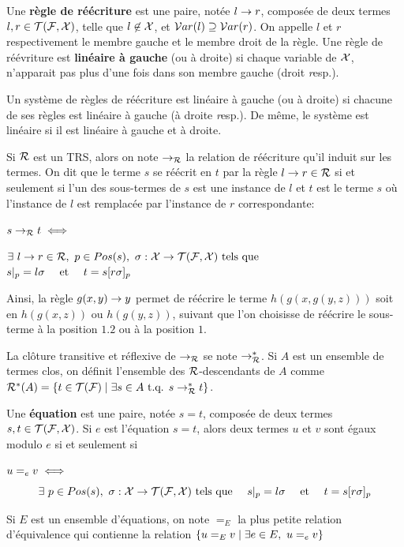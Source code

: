 \begin{definition}
  Une \textbf{règle de réécriture} est une paire, notée $l \rightarrow r$, composée de deux termes $l, r \in \mathcal{T(F, X)}$,
  telle que $l \not \in \mathcal X$, et $\mathcal{ V}ar(l) \supseteq \mathcal{ V}ar(r)$. 
  On appelle $l$ et $r$ respectivement le membre gauche et le membre droit de la règle.
  Une règle de réévriture est \textbf{linéaire à gauche} (ou à droite) si chaque variable de $\mathcal X$, 
  n'apparait pas plus d'une fois dans son membre gauche (droit {\textit resp.}).
\end{definition}

Un système de règles de réécriture est linéaire à gauche (ou à droite) si chacune 
de ses règles est linéaire à gauche (à droite {\textit resp.}). De même, le système est 
linéaire si il est linéaire à gauche et à droite.

\begin{definition}
  Si $\mathcal R$ est un TRS, alors on note $\rightarrow_{\mathcal R}$ la relation de réécriture qu'il induit sur les termes.
  On dit que le terme $s$ se réécrit en $t$ par la règle $l \rightarrow r \in \mathcal R$ si et seulement si l'un des sous-termes de $s$
  est une instance de $l$ et $t$ est le terme $s$ où l'instance de $l$ est remplacée par l'instance de $r$ correspondante:

  \noindent $s \rightarrow_\mathcal R t \; \Longleftrightarrow \;$
  \begin{flushright}
    $\exists\ l \rw r \in \R,\ p \in Pos(s),\ \sigma: \X \rw \TFX \textrm{ tels que }\quad \quad \quad$
    $s|_p = l\sigma \quad \mbox{ et } \quad  t = s[r\sigma]_p$
  \end{flushright}
\end{definition}
Ainsi, la règle $g(x, y) \rightarrow y$ permet de réécrire le terme $h(g(x, g(y, z)))$ 
soit en $h(g(x, z))$ ou $h(g(y, z))$, suivant que l'on choisisse de réécrire le sous-terme
à la position $1.2$ ou à la position $1$.

La clôture transitive et réflexive de $\rightarrow_\mathcal R$ se note $\rightarrow^*_{\mathcal R}$.
Si $A$ est un ensemble de termes clos, on définit l'ensemble des $\mathcal R$-descendants 
de $A$ comme $\mathcal R^*(A) = \{t \in \mathcal{T(F)} \; | \; \exists s \in A \mbox{ t.q. } s \rightarrow^*_{\mathcal R} t \}$.

\begin{definition}
  Une \textbf{équation} est une paire, notée $s = t$, composée de deux termes $s, t \in \mathcal{T(F, X)}$.
  Si $e$ est l'équation $s = t$, alors deux termes $u$ et $v$ sont égaux modulo $e$ si et seulement si
  
  \noindent $u =_e v \; \Longleftrightarrow \;$\\
  \[\exists\ p \in Pos(s),\ \sigma: \mathcal X \rightarrow \mathcal{T(F, X)} \textrm{ tels que } \quad s|_p = l\sigma \quad \mbox{ et } \quad  t = s[r\sigma]_p\]
  
  Si $E$ est un ensemble d'équations, on note $=_E$ la plus petite relation d'équivalence qui contienne la relation
  $\{ u =_E v \; | \; \exists e \in E,\ u =_e v\}$
\end{definition}


